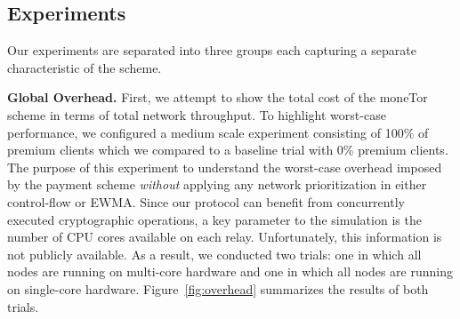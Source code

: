 \subsection{Experiments}

\label{subsec:experiments} Our experiments are separated into three groups each capturing a separate characteristic of the scheme.

\medskip \noindent \textbf{Global Overhead.}
First, we attempt to show the total cost of the moneTor scheme in terms of total network throughput.
To highlight worst-case performance, we configured a medium scale experiment consisting of 100\% of premium clients which we compared to a baseline trial with 0\% premium clients.
The purpose of this experiment to understand the worst-case overhead imposed by the payment scheme \emph{without} applying any network prioritization in either control-flow or EWMA.
Since our protocol can benefit from concurrently executed cryptographic operations, a key parameter to the simulation is the number of CPU cores available on each relay.
Unfortunately, this information is not publicly available.
As a result, we conducted two trials: one in which all nodes are running on multi-core hardware and one in which all nodes are running on single-core hardware.
Figure~\ref{fig:overhead} summarizes the results of both trials.

